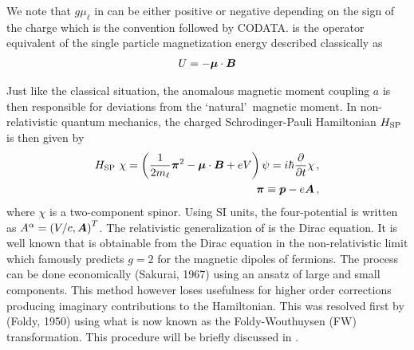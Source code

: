 We note that $g\mu_{\ell}$ in  can be either positive or negative depending on the sign of the charge which is the convention followed by CODATA.  is the operator equivalent of the single particle magnetization energy described classically as
\begin{align}
    \label{mag:3}
    U=-\boldsymbol{\mu}\cdot\boldsymbol{B}
\end{align}

Just like the classical situation, the anomalous magnetic moment coupling $a$ is then responsible for deviations from the \lq natural\rq\ magnetic moment. In non-relativistic quantum mechanics, the charged Schrodinger-Pauli Hamiltonian ${ H}_{\rm SP}$ is then given by
\begin{align}
	\label{sp:1}
    {H}_{\mathrm{SP}}\ \chi=\left(\frac{1}{2m_{\ell}}\bb{\pi}^{2}-\bb{\mu}\cdot\bb{B}+e{ V}\right)\psi=i\hbar\frac{\partial}{\partial t}\chi\,,\\
    \bb{\pi}\equiv\bb{ p}-e{\bb{A}}\,,
\end{align}
where $\chi$ is a two-component spinor. Using SI units, the four-potential is written as $A^{\alpha}=\left(V/c,\boldsymbol{A}\right)^{T}$. The relativistic generalization of  is the Dirac equation. It is well known that  is obtainable from the Dirac equation in the non-relativistic limit which famously predicts $g=2$ for the magnetic dipoles of fermions. The process can be done economically (Sakurai, 1967) using an ansatz of large and small components. This method however loses usefulness for higher order corrections producing imaginary contributions to the Hamiltonian. This was resolved first by (Foldy, 1950) using what is now known as the Foldy-Wouthuysen (FW) transformation. This procedure will be briefly discussed in .

